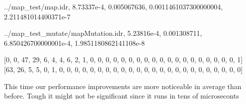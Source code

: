 \documentclass[
]{article}
\newenvironment{Shaded}{}{}
\newcommand{\DecValTok}[1]{\textcolor[rgb]{0.25,0.63,0.44}{#1}}
\newcommand{\FloatTok}[1]{\textcolor[rgb]{0.25,0.63,0.44}{#1}}
\newcommand{\FunctionTok}[1]{\textcolor[rgb]{0.02,0.16,0.49}{#1}}
\newcommand{\NormalTok}[1]{#1}
\newcommand{\OperatorTok}[1]{\textcolor[rgb]{0.40,0.40,0.40}{#1}}
\begin{document}
\begin{Shaded}
\begin{Highlighting}[]
\OperatorTok{../}\NormalTok{map\_test}\OperatorTok{/}\FunctionTok{map}\OperatorTok{.}\NormalTok{idr,}
\FloatTok{8.73337e{-}4}\NormalTok{,}
\FloatTok{0.005067636}\NormalTok{,}
\FloatTok{0.0011461037300000004}\NormalTok{,}
\FloatTok{2.211481014400371e{-}7}

\OperatorTok{../}\NormalTok{map\_test\_mutate}\OperatorTok{/}\NormalTok{mapMutation}\OperatorTok{.}\NormalTok{idr,}
\FloatTok{5.23816e{-}4}\NormalTok{,}
\FloatTok{0.001308711}\NormalTok{,}
\FloatTok{6.850426700000001e{-}4}\NormalTok{,}
\FloatTok{1.9851180862141108e{-}8}

\NormalTok{[}\DecValTok{0}\NormalTok{, }\DecValTok{0}\NormalTok{, }\DecValTok{47}\NormalTok{, }\DecValTok{29}\NormalTok{, }\DecValTok{6}\NormalTok{, }\DecValTok{4}\NormalTok{, }\DecValTok{4}\NormalTok{, }\DecValTok{6}\NormalTok{, }\DecValTok{2}\NormalTok{, }\DecValTok{1}\NormalTok{, }\DecValTok{0}\NormalTok{, }\DecValTok{0}\NormalTok{, }\DecValTok{0}\NormalTok{, }\DecValTok{0}\NormalTok{, }\DecValTok{0}\NormalTok{, }\DecValTok{0}\NormalTok{, }\DecValTok{0}\NormalTok{, }
\DecValTok{0}\NormalTok{, }\DecValTok{0}\NormalTok{, }\DecValTok{0}\NormalTok{, }\DecValTok{0}\NormalTok{, }\DecValTok{0}\NormalTok{, }\DecValTok{0}\NormalTok{, }\DecValTok{0}\NormalTok{, }\DecValTok{0}\NormalTok{, }\DecValTok{0}\NormalTok{, }\DecValTok{0}\NormalTok{, }\DecValTok{0}\NormalTok{, }\DecValTok{0}\NormalTok{, }\DecValTok{1}\NormalTok{]}
\NormalTok{[}\DecValTok{63}\NormalTok{, }\DecValTok{26}\NormalTok{, }\DecValTok{5}\NormalTok{, }\DecValTok{5}\NormalTok{, }\DecValTok{0}\NormalTok{, }\DecValTok{1}\NormalTok{, }\DecValTok{0}\NormalTok{, }\DecValTok{0}\NormalTok{, }\DecValTok{0}\NormalTok{, }\DecValTok{0}\NormalTok{, }\DecValTok{0}\NormalTok{, }\DecValTok{0}\NormalTok{, }\DecValTok{0}\NormalTok{, }\DecValTok{0}\NormalTok{, }\DecValTok{0}\NormalTok{, }\DecValTok{0}\NormalTok{, }\DecValTok{0}\NormalTok{, }
\DecValTok{0}\NormalTok{, }\DecValTok{0}\NormalTok{, }\DecValTok{0}\NormalTok{, }\DecValTok{0}\NormalTok{, }\DecValTok{0}\NormalTok{, }\DecValTok{0}\NormalTok{, }\DecValTok{0}\NormalTok{, }\DecValTok{0}\NormalTok{, }\DecValTok{0}\NormalTok{, }\DecValTok{0}\NormalTok{, }\DecValTok{0}\NormalTok{, }\DecValTok{0}\NormalTok{, }\DecValTok{0}\NormalTok{]}
\end{Highlighting}
\end{Shaded}

This time our performance improvements are more noticeable in average
than before. Tough it might not be significant since it runs in tens of
microseconts
\end{document}
